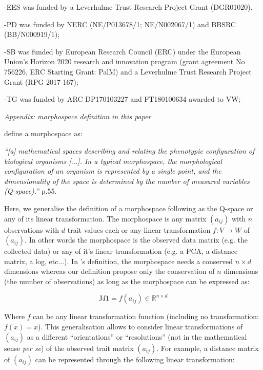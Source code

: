 \documentclass[12pt,letterpaper]{article}
\renewcommand{\subsection}[1]{%
\bigskip
\begin{center}
\begin{large}
\normalfont\itshape #1
\end{large}
\end{center}}
\begin{document}
-EES was funded by a Leverhulme Trust Research Project Grant (DGR01020).

-PD was funded by NERC (NE/P013678/1; NE/N002067/1) and BBSRC (BB/N000919/1);

-SB was funded by European Research Council (ERC) under the European Union's Horizon 2020 research and innovation program (grant agreement No 756226, ERC Starting Grant: PalM) and a Leverhulme Trust Research Project Grant (RPG-2017-167);

-TG was funded by ARC DP170103227 and FT180100634 awarded to VW;


\subsection{Appendix: morphospace definition in this paper}
\label{section:appendixmorphospace}

\noindent \cite{mitteroecker2009concept} define a morphospace as:

\setlength{\leftskip}{1cm}
\setlength{\rightskip}{1cm}

\noindent \textit{``[a] mathematical spaces describing and relating the phenotypic configuration of biological organisms [...]. In a typical morphospace, the morphological configuration of an organism is represented by a single point, and the dimensionality of the space is determined by the number of measured variables (Q-space).''} \citealt{mitteroecker2009concept} p.55.

\setlength{\leftskip}{0pt}
\setlength{\rightskip}{0pt}

\noindent Here, we generalise the definition of a morphospace following \cite{mitteroecker2009concept} as the Q-space or any of its linear transformation.
The morphospace is any matrix $(a_{ij})$ with $n$ observations with $d$ trait values each or any linear transformation $f: V \to W$ of $(a_{ij})$.
In other words the morphospace is the observed data matrix (e.g. the collected data) or any of it's linear transformation (e.g. a PCA, a distance matrix, a log, etc...).
In \cite{mitteroecker2009concept}'s definition, the morphospace needs a conserved $n \times d$ dimensions whereas our definition propose only the conservation of $n$ dimensions (the number of observations) as long as the morphospace can be expressed as:

\begin{equation}
    M1 = f(a_{ij})\in \mathbb{R}^{{n}\times{d}}
\end{equation}

\noindent Where $f$ can be any linear transformation function (including no transformation: $f(x) = x$).
This generalisation allows to consider linear transformations of $(a_{ij})$ as a different ``orientations'' or ``resolutions'' (not in the mathematical sense \textit{per se}) of the observed trait matrix $(a_{ij})$. For example, a distance matrix of $(a_{ij})$ can be represented through the following linear transformation:
\end{document}
